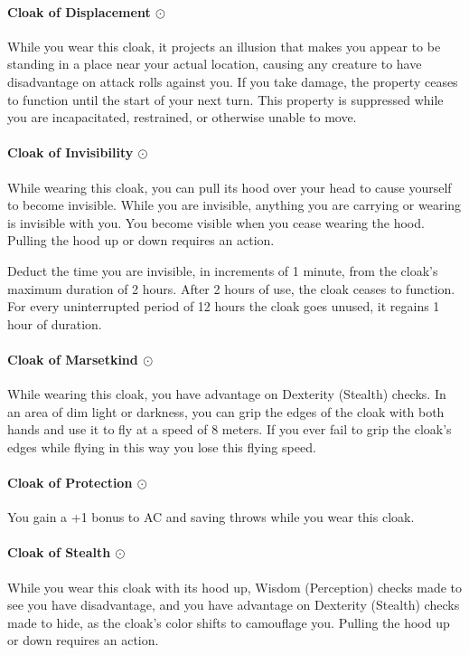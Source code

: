    \paragraph{Cloak of Displacement $\odot$}
        While you wear this cloak, it projects an illusion that makes you appear to be standing in a place near your actual location, causing any creature to have disadvantage on attack rolls against you.
        If you take damage, the property ceases to function until the start of your next turn.
        This property is suppressed while you are incapacitated, restrained, or otherwise unable to move.
    \paragraph{Cloak of Invisibility $\odot$}
        While wearing this cloak, you can pull its hood over your head to cause yourself to become invisible.
        While you are invisible, anything you are carrying or wearing is invisible with you.
        You become visible when you cease wearing the hood.
        Pulling the hood up or down requires an action.

        Deduct the time you are invisible, in increments of 1 minute, from the cloak's maximum duration of 2 hours.
        After 2 hours of use, the cloak ceases to function.
        For every uninterrupted period of 12 hours the cloak goes unused, it regains 1 hour of duration.
    \paragraph{Cloak of Marsetkind $\odot$}
        While wearing this cloak, you have advantage on Dexterity (Stealth) checks.
        In an area of dim light or darkness, you can grip the edges of the cloak with both hands and use it to fly at a speed of 8 meters.
        If you ever fail to grip the cloak's edges while flying in this way you lose this flying speed.
    \paragraph{Cloak of Protection $\odot$}
        You gain a +1 bonus to AC and saving throws while you wear this cloak.
    \paragraph{Cloak of Stealth $\odot$}
        While you wear this cloak with its hood up, Wisdom (Perception) checks made to see you have disadvantage, and you have advantage on Dexterity (Stealth) checks made to hide, as the cloak's color shifts to camouflage you.
        Pulling the hood up or down requires an action.
